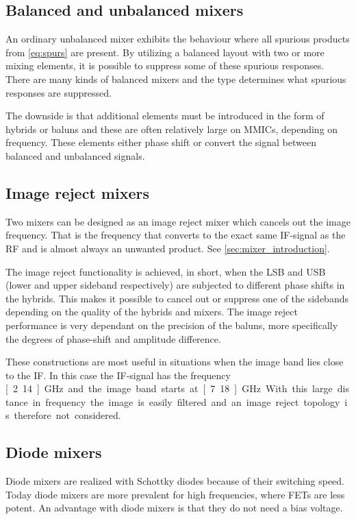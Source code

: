 		\subsection{Balanced and unbalanced mixers}
			An ordinary unbalanced mixer exhibits the behaviour where all spurious products from \autoref{eq:spurs} are present. By utilizing a balanced layout with two or more mixing elements, it is possible to suppress some of these spurious responses. There are many kinds of balanced mixers and the type determines what spurious responses are suppressed.\autocites{maas92}{dinari09}

			The downside is that additional elements must be introduced in the form of hybrids or baluns and these are often relatively large on MMICs, depending on frequency. These elements either phase shift or convert the signal between balanced and unbalanced signals.

		\subsection{Image reject mixers}
			Two mixers can be designed as an image reject mixer which cancels out the image frequency. That is the frequency that converts to the exact same IF-signal as the RF and is almost always an unwanted product. See \autoref{sec:mixer_introduction}.

			The image reject functionality is achieved, in short, when the LSB and USB (lower and upper sideband respectively) are subjected to different phase shifts in the hybrids. This makes it possible to cancel out or suppress one of the sidebands depending on the quality of the hybrids and mixers. The image reject performance is very dependant on the precision of the baluns, more specifically the degrees of phase-shift and amplitude difference.\autocite{henderson85} %

			These constructions are most useful in situations when the image band lies close to the IF. In this case the IF-signal has the frequency \unit[2.14]{GHz} and the image band starts at \unit[7.18]{GHz}. With this large distance in frequency the image is easily filtered and an image reject topology is therefore not considered.

		\subsection{Diode mixers}
			Diode mixers are realized with Schottky diodes because of their switching speed. Today diode mixers are more prevalent for high frequencies, where FETs are less potent. An advantage with diode mixers is that they do not need a bias voltage.

